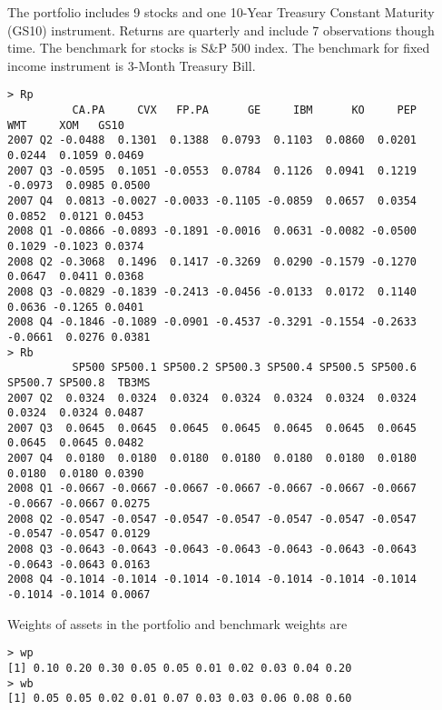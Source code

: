 \documentclass[11pt,a4paper]{article}
\begin{document}
The portfolio includes 9 stocks and one 10-Year Treasury Constant Maturity (GS10) instrument. Returns are quarterly and include 7 observations though time. The benchmark for stocks is S\&P 500 index. The benchmark for fixed income instrument is 3-Month Treasury Bill.
\begingroup
\fontsize{9pt}{12pt}\selectfont
\begin{verbatim}
> Rp
          CA.PA     CVX   FP.PA      GE     IBM      KO     PEP     WMT     XOM   GS10
2007 Q2 -0.0488  0.1301  0.1388  0.0793  0.1103  0.0860  0.0201  0.0244  0.1059 0.0469
2007 Q3 -0.0595  0.1051 -0.0553  0.0784  0.1126  0.0941  0.1219 -0.0973  0.0985 0.0500
2007 Q4  0.0813 -0.0027 -0.0033 -0.1105 -0.0859  0.0657  0.0354  0.0852  0.0121 0.0453
2008 Q1 -0.0866 -0.0893 -0.1891 -0.0016  0.0631 -0.0082 -0.0500  0.1029 -0.1023 0.0374
2008 Q2 -0.3068  0.1496  0.1417 -0.3269  0.0290 -0.1579 -0.1270  0.0647  0.0411 0.0368
2008 Q3 -0.0829 -0.1839 -0.2413 -0.0456 -0.0133  0.0172  0.1140  0.0636 -0.1265 0.0401
2008 Q4 -0.1846 -0.1089 -0.0901 -0.4537 -0.3291 -0.1554 -0.2633 -0.0661  0.0276 0.0381
> Rb
          SP500 SP500.1 SP500.2 SP500.3 SP500.4 SP500.5 SP500.6 SP500.7 SP500.8  TB3MS
2007 Q2  0.0324  0.0324  0.0324  0.0324  0.0324  0.0324  0.0324  0.0324  0.0324 0.0487
2007 Q3  0.0645  0.0645  0.0645  0.0645  0.0645  0.0645  0.0645  0.0645  0.0645 0.0482
2007 Q4  0.0180  0.0180  0.0180  0.0180  0.0180  0.0180  0.0180  0.0180  0.0180 0.0390
2008 Q1 -0.0667 -0.0667 -0.0667 -0.0667 -0.0667 -0.0667 -0.0667 -0.0667 -0.0667 0.0275
2008 Q2 -0.0547 -0.0547 -0.0547 -0.0547 -0.0547 -0.0547 -0.0547 -0.0547 -0.0547 0.0129
2008 Q3 -0.0643 -0.0643 -0.0643 -0.0643 -0.0643 -0.0643 -0.0643 -0.0643 -0.0643 0.0163
2008 Q4 -0.1014 -0.1014 -0.1014 -0.1014 -0.1014 -0.1014 -0.1014 -0.1014 -0.1014 0.0067
\end{verbatim}
\endgroup

Weights of assets in the portfolio and benchmark weights are
\begingroup
\fontsize{9pt}{12pt}\selectfont
\begin{verbatim}
> wp
[1] 0.10 0.20 0.30 0.05 0.05 0.01 0.02 0.03 0.04 0.20
> wb
[1] 0.05 0.05 0.02 0.01 0.07 0.03 0.03 0.06 0.08 0.60
\end{verbatim}
\endgroup
\end{document}
